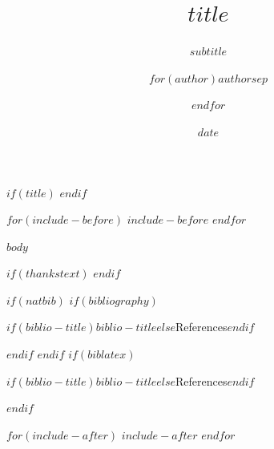 \documentclass[$for(classoption)$$classoption$$sep$,$endfor$$if(aspectratio)$$if(classoption)$,$endif$aspectratio=$aspectratio$$endif$]{beamer}
\title{$title$}
\subtitle{$subtitle$}
\author{$for(author)$$author$$sep$ \and $endfor$}
\date{$date$}
\institute{$for(institute)$$institute$$sep$ \and $endfor$}
\begin{document}
$if(title)$
\frame{\maketitle}
$endif$

$for(include-before)$
$include-before$
$endfor$

$body$

$if(thankstext)$
$endif$

$if(natbib)$
$if(bibliography)$
\begin{frame}[allowframebreaks]{$if(biblio-title)$$biblio-title$$else$References$endif$}
  \bibliographytrue
  
\end{frame}
$endif$
$endif$
$if(biblatex)$
\begin{frame}[allowframebreaks]{$if(biblio-title)$$biblio-title$$else$References$endif$}
  \bibliographytrue
  \printbibliography[heading=none]
\end{frame}
$endif$

$for(include-after)$
$include-after$
$endfor$
\end{document}
